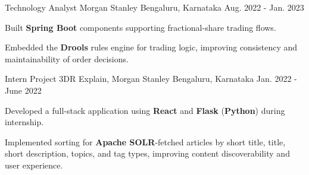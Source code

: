 \begin{cventries}
  \cventry
    {Technology Analyst} %
    {Morgan Stanley} %
    {Bengaluru, Karnataka} %
    {Aug. 2022 - Jan. 2023} %
    {
      \begin{cvitems} %
        \item {Built \textbf{Spring Boot} components supporting fractional-share trading flows.}
        \item {Embedded the \textbf{Drools} rules engine for trading logic, improving consistency and maintainability of order decisions.}
      \end{cvitems}
    }

  \cventry
    {Intern Project} %
    {3DR Explain, Morgan Stanley} %
    {Bengaluru, Karnataka} %
    {Jan. 2022 - June 2022} %
    {
      \begin{cvitems} %
        \item {Developed a full-stack application using \textbf{React} and \textbf{Flask} (\textbf{Python}) during internship.}
        \item {Implemented sorting for \textbf{Apache SOLR}-fetched articles by short title, title, short description, topics, and tag types, improving content discoverability and user experience.}
      \end{cvitems}
    }

\end{cventries}
